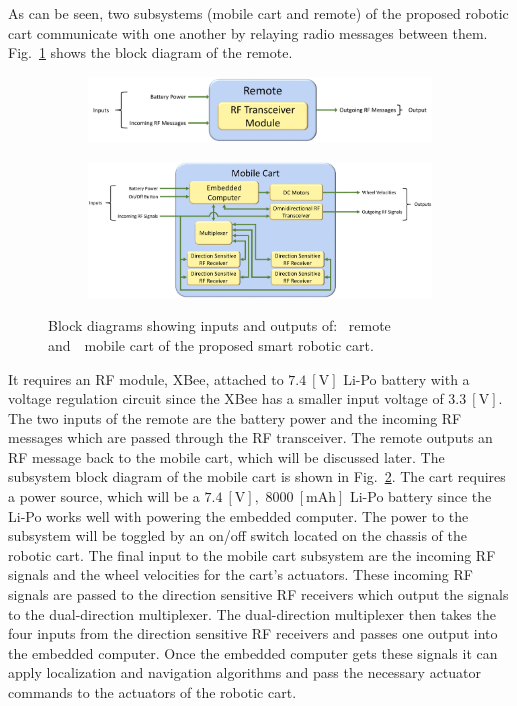 \documentclass[conference]{IEEEtran}
\begin{document}
As can be seen, two subsystems (mobile cart and remote) of the proposed robotic cart communicate with one another by relaying radio messages between them. Fig.~\ref{fig:remote_block_diag} shows the block diagram of the remote. %
%
\begin{figure}[htbp]
  \begin{subfigure}[b]{0.9\linewidth}
    \centering
    \includegraphics[width=\textwidth]{figs/remoteBlockDiagram.pdf}
    \caption{}
    \label{fig:remote_block_diag}
  \end{subfigure}
  \begin{subfigure}[b]{0.9\linewidth}
    \centering
    \includegraphics[width=\textwidth]{figs/mobileCartBlockDiagram.pdf}
    \caption{}
    \label{fig:mobile_block_diag}
  \end{subfigure}
  \caption{Block diagrams showing inputs and outputs of:~ remote and~~mobile cart of the proposed smart robotic cart.}
  \label{fig:blockDiagramRemoteMobileCart}
\end{figure}
%
It requires an RF module, XBee, attached to $7.4~[\si{\volt}]$ Li-Po battery
with a voltage regulation circuit since the XBee has a smaller input voltage of
$3.3~[\si{\volt}].$ The two inputs of the remote are the battery power and the
incoming RF messages which are passed through the RF transceiver. The remote
outputs an RF message back to the mobile cart, which will be discussed
later. The subsystem block diagram of the mobile cart is shown in
Fig.~\ref{fig:mobile_block_diag}. The cart requires a power source, which will
be a $7.4~[\si{\volt}],$ $8000~[\si{\milli\ampere\hour}]$ Li-Po battery since the Li-Po works well with powering the
embedded computer. The power to the subsystem will be toggled
by an on/off switch located on the chassis of the robotic cart. The final input
to the mobile cart subsystem are the incoming RF signals and the wheel velocities for the cart's actuators. These incoming RF
signals are passed to the direction sensitive RF receivers which output the
signals to the dual-direction multiplexer. The dual-direction multiplexer then
takes the four inputs from the direction sensitive RF receivers and passes one
output into the embedded computer. Once the embedded computer gets these signals
it can apply localization and navigation algorithms and pass the necessary actuator commands to the actuators of the robotic cart. 
\end{document}
